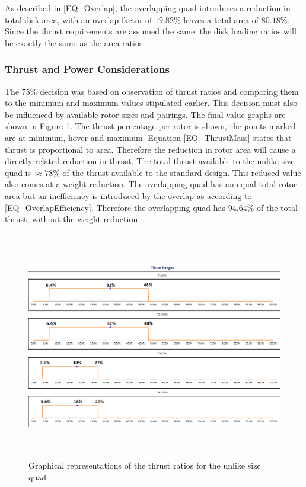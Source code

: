 As described in \eqref{EQ_Overlap}, the overlapping quad introduces a reduction in total disk area, with an overlap factor of $19.82\%$ leaves a total area of $80.18\%$. Since the thrust requirements are assumed the same, the disk loading ratios will be exactly the same as the area ratios.

\subsubsection{Thrust and Power Considerations}
The $75\%$ decision was based on observation of thrust ratios and comparing them to the minimum and maximum values stipulated earlier. This decision must also be influenced by available rotor sizes and pairings. The final value graphs are shown in Figure \ref{IM_ExcelGraphs}. The thrust percentage per rotor is shown, the points marked are at minimum, hover and maximum. Equation \eqref{EQ_ThrustMass} states that thrust is proportional to area. Therefore the reduction in rotor area will cause a directly related reduction in thrust. The total thrust available to the unlike size quad is $\approx 78\%$ of the thrust available to the standard design. This reduced value also comes at a weight reduction. The overlapping quad has an equal total rotor area but an inefficiency is introduced by the overlap as according to \eqref{EQ_OverlapEfficiency}. Therefore the overlapping quad has $94.64\%$ of the total thrust, without the weight reduction.

\begin{figure}[H]
\centering
\includegraphics[height = 10cm]{Images/Design/ExcelGraphs}
\caption{Graphical representations of the thrust ratios for the unlike size quad}
\label{IM_ExcelGraphs}
\end{figure}

